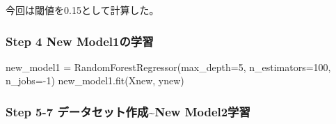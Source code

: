 \documentclass[11pt]{jsarticle}
\newenvironment{Shaded}{}{}
\newcommand{\DecValTok}[1]{\textcolor[rgb]{0.25,0.63,0.44}{{#1}}}
\newcommand{\NormalTok}[1]{{#1}}
\newcommand{\OperatorTok}[1]{\textcolor[rgb]{0.40,0.40,0.40}{{#1}}}
\begin{document}
    今回は閾値を0.15として計算した。

    \subsubsection{Step 4 New
Model1の学習}\label{step-4-new-model1ux306eux5b66ux7fd2}

    \begin{Shaded}
\begin{Highlighting}[]
\NormalTok{new_model1 }\OperatorTok{=}\NormalTok{ RandomForestRegressor(max_depth}\OperatorTok{=}\DecValTok{5}\NormalTok{, n_estimators}\OperatorTok{=}\DecValTok{100}\NormalTok{, n_jobs}\OperatorTok{=-}\DecValTok{1}\NormalTok{)}
\NormalTok{new_model1.fit(Xnew, ynew)}
\end{Highlighting}
\end{Shaded}

    \subsubsection{Step 5-7 データセット作成\textasciitilde{}New
Model2学習}\label{step-5-7-ux30c7ux30fcux30bfux30bbux30c3ux30c8ux4f5cux6210new-model2ux5b66ux7fd2}
\end{document}

